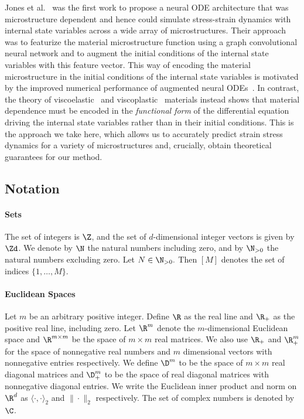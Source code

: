 \documentclass[letterpaper,11pt]{article}
\begin{document}
Jones et al.~\cite{jones2022neural} was the first work to propose a neural ODE architecture that was microstructure dependent and hence could simulate stress-strain dynamics with internal state variables across a wide array of microstructures. Their approach was to featurize the material microstructure function using a graph convolutional neural network and to augment the initial conditions of the internal state variables with this feature vector. This way of encoding the material microstructure in the initial conditions of the internal state variables is motivated by the improved numerical performance of augmented neural ODEs~\cite{dupont2019augmented}. In contrast, the theory of viscoelastic~\cite{bhattacharya2023learning} and viscoplastic~\cite{liu2023learning} materials instead shows that material dependence must be encoded in the \textit{functional form} of the differential equation driving the internal state variables rather than in their initial conditions. This is the approach we take here, which allows us to accurately predict strain stress dynamics for a variety of microstructures and, crucially, obtain theoretical guarantees for our method.



\subsection{Notation}
\label{ssec:N}
\paragraph{Sets}
 The set of integers is $\Z$, and the set of $d$-dimensional integer vectors is given by $\Zd$. We denote by $\N$  the natural numbers including zero, and by $\N_{>0}$ the natural numbers excluding zero. Let $N \in \N_{>0}.$ Then  $[M]$ denotes the set of indices $\{1, \dots, M\}$.

\paragraph{Euclidean Spaces}
Let $m$ be an arbitrary positive integer. Define $\R$ as the real line and $\R_+$ as the positive real line, including zero. Let $\R^m$ denote the $m$-dimensional Euclidean space and $\R^{m \times m}$ be the space of $m \times m$ real matrices. We also use $\R_+$ and $\R_+^m$ for the space of nonnegative real numbers and $m$ dimensional vectors with nonnegative entries respectively. We define $\D^m$ to be the space of $m \times m$ real diagonal matrices and $\D_+^m$ to be the space of real diagonal matrices with nonnegative diagonal entries. 
We write the Euclidean inner product and norm on $\R^d$ as $\langle \cdot, \cdot\rangle_2$ and $\|\cdot\|_2$ respectively. The set of complex numbers is denoted by $\C$.
\end{document}
